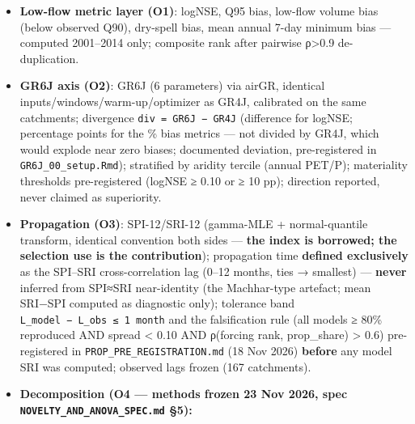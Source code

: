 \documentclass[
  english,
  11pt,
]{article}
\providecommand{\tightlist}{%
  \setlength{\itemsep}{0pt}\setlength{\parskip}{0pt}}
\begin{document}
\begin{itemize}
\tightlist
\item
  \textbf{Low-flow metric layer (O1)}: logNSE, Q95 bias, low-flow volume
  bias (below observed Q90), dry-spell bias, mean annual 7-day minimum
  bias --- computed 2001--2014 only; composite rank after pairwise
  ρ\textgreater0.9 de-duplication.
\item
  \textbf{GR6J axis (O2)}: GR6J (6 parameters) via airGR, identical
  inputs/windows/warm-up/optimizer as GR4J, calibrated on the same
  catchments; divergence \texttt{div\ =\ GR6J\ −\ GR4J} (difference for
  logNSE; percentage points for the \% bias metrics --- not divided by
  GR4J, which would explode near zero biases; documented deviation,
  pre-registered in \texttt{GR6J\_00\_setup.Rmd}); stratified by aridity
  tercile (annual PET/P); materiality thresholds pre-registered (logNSE
  ≥ 0.10 or ≥ 10 pp); direction reported, never claimed as superiority.
\item
  \textbf{Propagation (O3)}: SPI-12/SRI-12 (gamma-MLE + normal-quantile
  transform, identical convention both sides --- \textbf{the index is
  borrowed; the selection use is the contribution}); propagation time
  \textbf{defined exclusively} as the SPI--SRI cross-correlation lag
  (0--12 months, ties → smallest) --- \textbf{never} inferred from
  SPI≈SRI near-identity (the Machhar-type artefact; mean
  \textbar SRI−SPI\textbar{} computed as diagnostic only); tolerance
  band \texttt{\textbar{}L\_model\ −\ L\_obs\textbar{}\ ≤\ 1\ month} and
  the falsification rule (all models ≥ 80\% reproduced AND spread
  \textless{} 0.10 AND ρ(forcing rank, prop\_share) \textgreater{} 0.6)
  pre-registered in \texttt{PROP\_PRE\_REGISTRATION.md} (18 Nov 2026)
  \textbf{before} any model SRI was computed; observed lags frozen (167
  catchments).
\item
  \textbf{Decomposition (O4 --- methods frozen 23 Nov 2026, spec
  \texttt{NOVELTY\_AND\_ANOVA\_SPEC.md} §5):}


\end{itemize}
\end{document}
